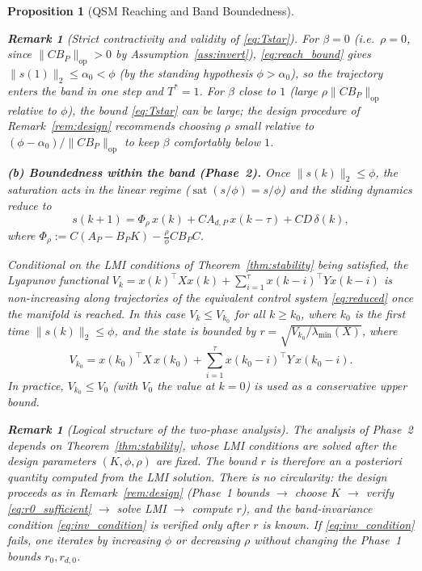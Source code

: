 \documentclass[10pt]{amsart}
\DeclareMathOperator{\sat}{sat}
\numberwithin{equation}{section}
\newtheorem{proposition}[theorem]{Proposition}
\newtheorem{remark}[theorem]{Remark}
\begin{document}
\begin{proposition}[QSM Reaching and Band Boundedness]
\begin{remark}[Strict contractivity and validity of \eqref{eq:Tstar}]
For $\beta = 0$ (i.e.\ $\rho = 0$, since $\|CB_P\|_{\mathrm{op}}>0$ by
Assumption~\ref{ass:invert}), \eqref{eq:reach_bound} gives
$\|s(1)\|_2 \leq \alpha_0 < \phi$ (by the standing hypothesis $\phi > \alpha_0$),
so the trajectory enters the band in one step and $T^* = 1$. For $\beta$ close to $1$
(large $\rho\|CB_P\|_{\mathrm{op}}$ relative to $\phi$), the bound \eqref{eq:Tstar}
can be large; the design procedure of Remark~\ref{rem:design} recommends choosing $\rho$
small relative to $(\phi-\alpha_0)/\|CB_P\|_{\mathrm{op}}$ to keep $\beta$ comfortably
below $1$.
\end{remark}

\noindent\textbf{(b) Boundedness within the band (Phase~2).}
Once $\|s(k)\|_2 \leq \phi$, the saturation acts in the linear regime
($\sat(s/\phi) = s/\phi$) and the sliding dynamics reduce to
\[
s(k+1) = \Phi_\rho\, x(k) + CA_{d,P}\,x(k-\tau) + CD\,\delta(k),
\]
where $\Phi_\rho := C(A_P - B_PK) - \tfrac{\rho}{\phi}CB_PC$.

\emph{Conditional on the LMI conditions of Theorem~\ref{thm:stability} being satisfied,}
the Lyapunov functional $V_k = x(k)^\top X x(k) + \sum_{i=1}^\tau x(k-i)^\top Y x(k-i)$
is non-increasing along trajectories of the equivalent control system \eqref{eq:reduced}
once the manifold is reached. In this case $V_k \leq V_{k_0}$ for all $k \geq k_0$,
where $k_0$ is the first time $\|s(k)\|_2 \leq \phi$, and the state is bounded by
$r = \sqrt{V_{k_0}/\lambda_{\min}(X)}$, where
\begin{equation}\label{eq:V0_explicit}
  V_{k_0} = x(k_0)^\top X\, x(k_0) + \sum_{i=1}^\tau x(k_0-i)^\top Y\, x(k_0-i).
\end{equation}
In practice, $V_{k_0} \leq V_0$ (with $V_0$ the value at $k=0$) is used as a
conservative upper bound.

\begin{remark}[Logical structure of the two-phase analysis]\label{rem:two_phase_logic}
The analysis of Phase~2 depends on Theorem~\ref{thm:stability}, whose LMI conditions
are solved \emph{after} the design parameters $(K, \phi, \rho)$ are fixed. The bound
$r$ is therefore an \emph{a posteriori} quantity computed from the LMI solution.
There is no circularity: the design proceeds as in Remark~\ref{rem:design}
(Phase~1 bounds $\to$ choose $K$ $\to$ verify \eqref{eq:r0_sufficient} $\to$
solve LMI $\to$ compute $r$), and the band-invariance condition
\eqref{eq:inv_condition} is verified only after $r$ is known. If
\eqref{eq:inv_condition} fails, one iterates by increasing $\phi$ or decreasing $\rho$
without changing the Phase~1 bounds $r_0, r_{d,0}$.


\end{remark}
\end{proposition}
\end{document}
